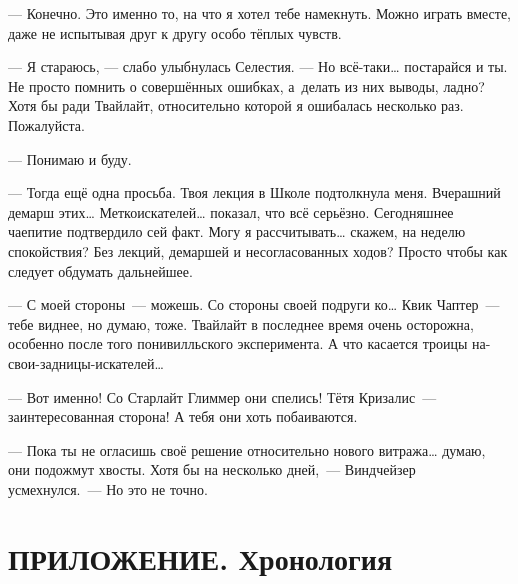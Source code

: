 \documentclass[fontsize=11pt,a5paper,titlepage=firstcover]{scrbook}
\begin{document}
--- Конечно. Это именно то, на что я хотел тебе намекнуть. Можно играть вместе, даже не испытывая друг к другу особо тёплых чувств.

--- Я стараюсь, --- слабо улыбнулась Селестия. --- Но всё-таки{\ldots} постарайся и ты. Не просто помнить о совершённых ошибках, а~делать из них выводы, ладно? Хотя бы ради Твайлайт, относительно которой я ошибалась несколько раз. Пожалуйста.

--- Понимаю и буду.

--- Тогда ещё одна просьба. Твоя лекция в Школе подтолкнула меня. Вчерашний демарш этих{\ldots} Меткоискателей{\ldots} показал, что всё серьёзно. Сегодняшнее чаепитие подтвердило сей факт. Могу я рассчитывать{\ldots} скажем, на неделю спокойствия? Без лекций, демаршей и несогласованных ходов? Просто чтобы как следует обдумать дальнейшее.

--- С моей стороны~--- можешь. Со стороны своей подруги ко{\ldots} Квик Чаптер~--- тебе виднее, но думаю, тоже. Твайлайт в последнее время очень осторожна, особенно после того понивилльского эксперимента. А что касается троицы на-свои-задницы-искателей{\ldots}

--- Вот именно! Со Старлайт Глиммер они спелись! Тётя Кризалис~--- заинтересованная сторона! А тебя они хоть побаиваются.

--- Пока ты не огласишь своё решение относительно нового витража{\ldots} думаю, они подожмут хвосты. Хотя бы на несколько дней,~--- Виндчейзер усмехнулся.~--- Но это не точно.




\chapter*{ПРИЛОЖЕНИЕ. Хронология}


\newlength{\ado}
\ado=2.15mm
\end{document}

